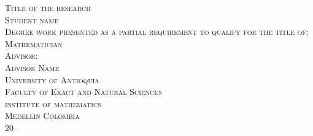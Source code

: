 \newpage{\pagestyle{empty}\cleardoublepage}
\newpage
\begin{center}
\thispagestyle{empty} 
\vspace*{-1cm}
\textsc{\huge Title of the research}\\[2.0cm]
\textsc{\large Student name\\[3.0cm]
Degree work presented as a partial\linebreak
requirement to qualify for the title of:\\
Mathematician\\[3.0cm]
Advisor:\\
Advisor Name\\[2.5cm]
University of Antioquia\\
Faculty of Exact and Natural Sciences\\
institute of mathematics\\
Medellin Colombia\\
20--}\\
\end{center}
\newpage
\leavevmode\thispagestyle{empty}\newpage

